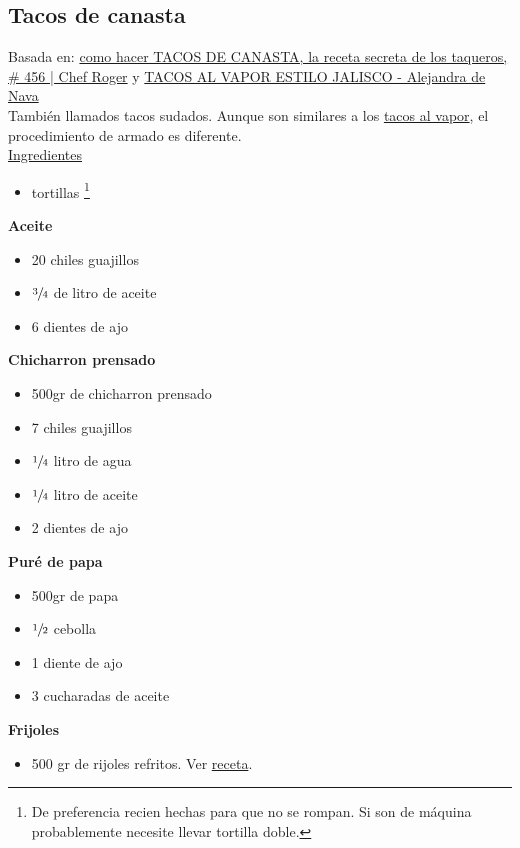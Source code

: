 \subsection{Tacos de canasta}
\label{sec:tacos-de-canasta}

Basada en: \href{https://www.youtube.com/watch?v=kH0nLhOtY2s}{como hacer TACOS DE CANASTA, la receta secreta de los taqueros, \# 456 | Chef Roger} y \href{https://www.youtube.com/watch?v=PoDRiJ3zVmc}{TACOS AL VAPOR ESTILO JALISCO - Alejandra de Nava}\\

También llamados tacos sudados. Aunque son similares a los \href{sec:tacos-al-vapor}{tacos al vapor}, el procedimiento de armado es diferente.\\

\underline{Ingredientes} 

\begin{itemize}
\item {} tortillas \footnote{De preferencia recien hechas para que no se rompan. Si son de máquina probablemente necesite llevar tortilla doble.}
\end{itemize}

\textbf{Aceite}
\begin{itemize}
\item 20 chiles guajillos
\item $\sfrac{3}{4}$ de litro de aceite
\item 6 dientes de ajo
\end{itemize}

\textbf{Chicharron prensado}
\begin{itemize}
\item 500gr de chicharron prensado
\item 7 chiles guajillos
\item $\sfrac{1}{4}$ litro de agua
\item $\sfrac{1}{4}$ litro de aceite
\item 2 dientes de ajo
\end{itemize}

\textbf{Puré de papa}
\begin{itemize}
\item 500gr de papa
\item $\sfrac{1}{2}$ cebolla
\item 1 diente de ajo
\item 3 cucharadas de aceite
\end{itemize}

\textbf{Frijoles}
\begin{itemize}
\item 500 gr de rijoles refritos. Ver \href{sec:frijoles-refritos}{receta}.
\end{itemize}

